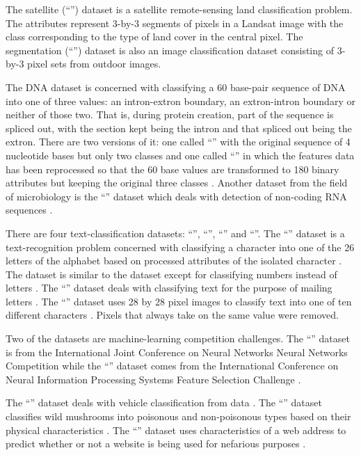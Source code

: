 The satellite (``'') dataset is a satellite remote-sensing land classification problem.
The attributes represent 3-by-3 segments of pixels in a Landsat 
image with the class corresponding to the type of land cover in the central pixel.
The segmentation (``'') dataset is also an image classification dataset consisting of 3-by-3
pixel sets from outdoor images.

The DNA dataset is concerned with classifying a 60 base-pair sequence of DNA into
one of three values: an intron-extron boundary, an extron-intron boundary or
neither of those two.
That is, during protein creation, part of the sequence is spliced out, with
the section kept being the intron and that spliced out being the extron.
There are two versions of it: one called ``'' with the original 
sequence of 4 nucleotide bases but only two classes 
and one called ``'' in which
the features data has been reprocessed so that
the 60 base values are transformed to 180 binary attributes but keeping the
original three classes \citep{Michie_etal1994}.
Another dataset from the field of microbiology is the ``'' dataset
which deals with detection of non-coding RNA sequences
\citep{Uzilov_etal2006}.

There are four text-classification datasets: ``'', ``'',
``'' and ``''.
The ``'' dataset is a text-recognition problem concerned with classifying
a character into one of the 26 letters of the alphabet based on processed
attributes of the isolated character \citep{Frey_Slate1991}.
The  dataset is similar to the  dataset except for
classifying numbers instead of letters \citep{Alimoglu1996}.
The ``'' dataset deals with classifying text for the purpose of mailing
letters \citep{Hull1994}.
The ``'' dataset uses 28 by 28 pixel images to classify text into one
of ten different characters \citep{LeCun_etal1998}. 
Pixels that always take on the same value were removed.

Two of the datasets are machine-learning competition challenges.
The ``'' dataset is from the International Joint Conference on Neural
Networks Neural Networks Competition\citep{Feldkamp_Puskorius1998} while the ``'' dataset comes 
from the International Conference on Neural Information Processing Systems
Feature Selection Challenge \citep{Guyon2004}.

The ``'' dataset deals with vehicle classification from  data
\citep{Duarte_Hu2004}.
The ``'' dataset classifies wild mushrooms
into poisonous and non-poisonous types based on their physical characteristics \citep{Iba_etal1988}.
The ``'' dataset uses characteristics of a web address to predict whether
or not a website is being used for nefarious purposes \citep{Mohommad_etal2012}.

